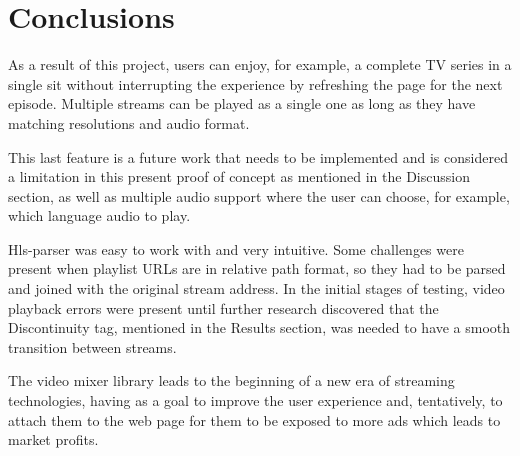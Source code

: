 \section{\textbf{Conclusions}}\label{sec:conclusions}

As a result of this project, users can enjoy, for example, a complete TV series in a single sit without interrupting the experience by refreshing the page for the next episode. Multiple streams can be played as a single one as long as they have matching resolutions and audio format.

This last feature is a future work that needs to be implemented and is considered a limitation in this present proof of concept as mentioned in the Discussion section, as well as multiple audio support where the user can choose, for example, which language audio to play.

Hls-parser was easy to work with and very intuitive. Some challenges were present when playlist URLs are in relative path format, so they had to be parsed and joined with the original stream address. In the initial stages of testing, video playback errors were present until further research discovered that the Discontinuity tag, mentioned in the Results section, was needed to have a smooth transition between streams.

The video mixer library leads to the beginning of a new era of streaming technologies, having as a goal to improve the user experience and, tentatively, to attach them to the web page for them to be exposed to more ads which leads to market profits.
